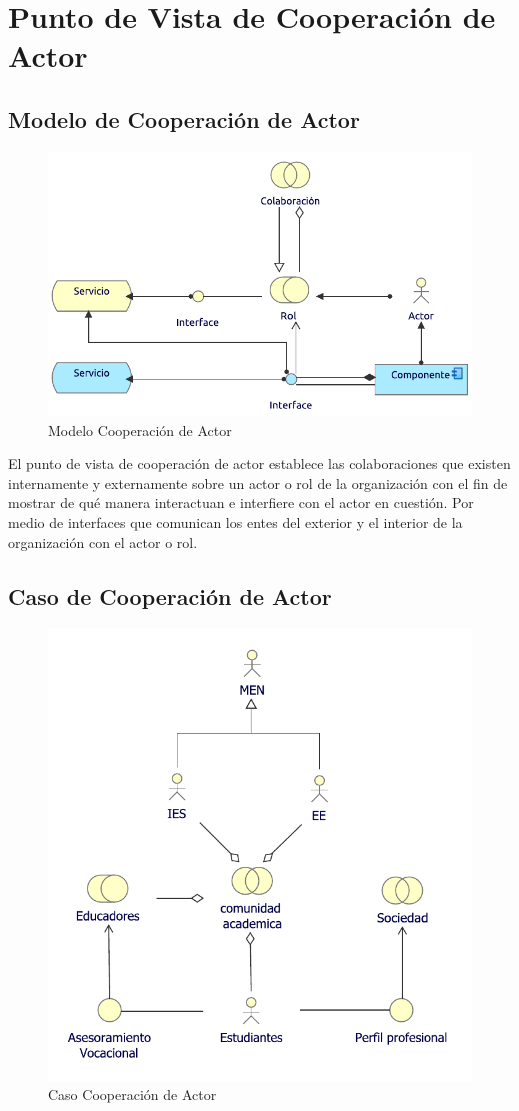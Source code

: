 \section{Punto de Vista de Cooperación de Actor}


\subsection{Modelo de Cooperación de Actor}
\begin{figure}[h!]
	\centering
	\includegraphics[width=.6\linewidth]{imgs/modelo/CoopActor.pdf}
	\caption{Modelo Cooperación de Actor}
\end{figure}

El punto de vista de cooperación de actor establece las colaboraciones que existen internamente y externamente sobre un actor o rol de la organización con el fin de mostrar de qué manera interactuan e interfiere con el actor en cuestión. Por medio de interfaces  que comunican los entes del exterior y el interior de la organización con el actor o rol.

\newpage
\subsection{Caso  de Cooperación de Actor}
\begin{figure}[h!]
	\centering
	\includegraphics[width=.9\linewidth]{imgs/caso/negocio/coperacion_actor.pdf}
	\caption{Caso Cooperación de Actor}
\end{figure}

